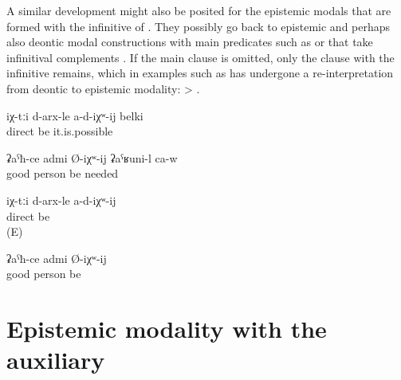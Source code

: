 A similar development might also be posited for the epistemic modals that are formed with the infinitive of . They possibly go back to epistemic and perhaps also deontic modal constructions with main predicates such as   or   that take infinitival complements . If the main clause is omitted, only the clause with the infinitive remains, which in examples such as  has undergone a re-interpretation from deontic to epistemic modality:   >  .
%
\begin{exe}
	\ex	\label{ex:Maybe they (= my thoughts) are not right}
	\gll	iχ-tːi	d-arx-le	a-d-iχʷ-ij	belki\\
			direct	be	it.is.possible\\
	\glt	{}

	\ex	\label{ex:He must be a good man / He should be a good man}
	\gll	ʡaˁħ-ce	admi	Ø-iχʷ-ij	ʡaˁʁuni-l	ca-w\\
		good	person	be	needed	\\
	\glt	{}

	\ex	\label{ex:They (= my thoughts) are probably not right}
	\gll	iχ-tːi	d-arx-le	a-d-iχʷ-ij\\
			direct	be\\
	\glt	{} (E)

	\ex	\label{ex:He is probably a good man}
	\gll	ʡaˁħ-ce	admi	Ø-iχʷ-ij\\
		good	person	be\\
	\glt	{}
\end{exe}



\section{Epistemic modality with the auxiliary \protect{} \protect{}}
\label{sec:Epistemic modality with the auxiliary b-urk find}

